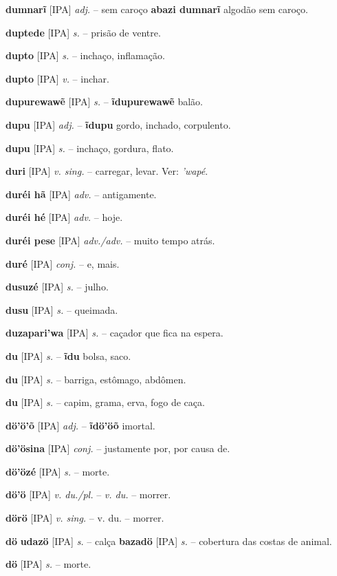 \textbf{dumnarĩ} [IPA] \textit{adj.} -- sem caroço  \textbf{abazi dumnarĩ} algodão sem caroço.

\textbf{duptede} [IPA] \textit{s.} -- prisão de ventre.

\textbf{dupto} [IPA] \textit{s.} -- inchaço, inflamação.

\textbf{dupto} [IPA] \textit{v.} -- inchar.

\textbf{dupurewawẽ} [IPA] \textit{s.} -- \textbf{ĩdupurewawẽ} balão.

\textbf{dupu} [IPA] \textit{adj.} -- \textbf{ĩdupu} gordo, inchado, corpulento.

\textbf{dupu} [IPA] \textit{s.} -- inchaço, gordura, flato.

\textbf{duri} [IPA] \textit{v. sing.} -- carregar, levar. Ver: \textit{'wapé}.

\textbf{duréi hã} [IPA] \textit{adv.} -- antigamente.

\textbf{duréi hé} [IPA] \textit{adv.} -- hoje.

\textbf{duréi pese} [IPA] \textit{adv./adv.} -- muito tempo atrás.

\textbf{duré} [IPA] \textit{conj.} -- e, mais.

\textbf{dusuzé} [IPA] \textit{s.} -- julho.

\textbf{dusu} [IPA] \textit{s.} -- queimada.

\textbf{duzapari'wa} [IPA] \textit{s.} -- caçador que fica na espera.

\textbf{du} [IPA] \textit{s.} -- \textbf{ĩdu} bolsa, saco.

\textbf{du} [IPA] \textit{s.} -- barriga, estômago, abdômen.

\textbf{du} [IPA] \textit{s.} -- capim, grama, erva, fogo de caça.

\textbf{dö'ö'õ} [IPA] \textit{adj.} -- \textbf{ĩdö'öõ} imortal.

\textbf{dö'ösina} [IPA] \textit{conj.} -- justamente por, por causa de.

\textbf{dö'özé} [IPA] \textit{s.} -- morte.

\textbf{dö'ö} [IPA] \textit{v. du./pl.} -- \textit{v. du.} -- morrer.

\textbf{dörö} [IPA] \textit{v. sing.} -- v. du. -- morrer.

\textbf{dö}  \textbf{udazö} [IPA] \textit{s.} -- calça  \textbf{bazadö} [IPA] \textit{s.} -- cobertura das costas de animal.

\textbf{dö} [IPA] \textit{s.} -- morte.

